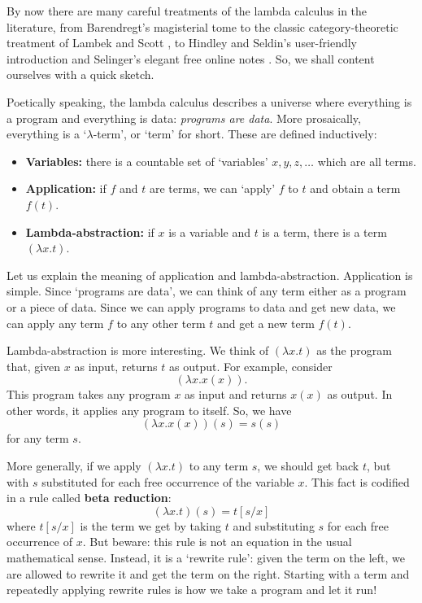 \documentclass[12pt,twoside,openright]{report}
\begin{document}
By now there are many careful treatments of the lambda calculus in the literature, from Barendregt's magisterial tome \cite{Barendregt}
to the classic category-theoretic treatment of Lambek and Scott
\cite{LS}, to Hindley and Seldin's user-friendly introduction 
\cite{HS} and Selinger's elegant free online notes \cite{Selinger2}.  So, we shall content ourselves with a quick sketch.

Poetically speaking, the lambda calculus describes a universe where everything is a program and everything is data: {\it programs are data}.  More prosaically, everything is a `$\lambda$-term', or `term'
for short.  These are defined inductively:
\begin{itemize}
\item {\bf Variables:}
there is a countable set of `variables' $x, y, z, \dots$
which are all terms. 
\item {\bf Application:}
if $f$ and $t$ are terms, we can `apply' $f$
to $t$ and obtain a term $f(t)$.
\item {\bf Lambda-abstraction:} if 
$x$ is a variable and $t$ is a term, there is a term 
$(\lambda x . t)$.
\end{itemize}

Let us explain the meaning of application and lambda-abstraction. Application is simple.  Since `programs are data', we can think of any term either as a program or a piece of data.  Since we can apply programs to data and get new data, we can apply any term $f$ to any other term $t$ and get a new term $f(t)$.

Lambda-abstraction is more interesting.  We think of $(\lambda x.t)$
as the program that, given $x$ as input, returns $t$ as output. For example, consider
\[       (\lambda x. x(x)) . \]
This program takes any program $x$ as input and returns $x(x)$ as output.  In other words, it applies any program to itself. So, we have
\[       (\lambda x . x(x))(s) = s(s) \]
for any term $s$.  

More generally, if we apply $(\lambda x . t)$ to any term $s$, we should get back $t$, but with $s$ substituted for each free occurrence of the variable $x$.  This fact is codified in a rule called {\bf beta reduction}:
\[       (\lambda x.t)(s) = t[s/x] \]
where $t[s/x]$ is the term we get by taking $t$ and substituting $s$
for each free occurrence of $x$.  But beware: this rule is not an equation in the usual mathematical sense.  Instead, it is a `rewrite rule': given the term on the left, we are allowed to rewrite it and get the term on the right.  Starting with a term and repeatedly applying rewrite rules is how we take a program and let it run!
\end{document}
